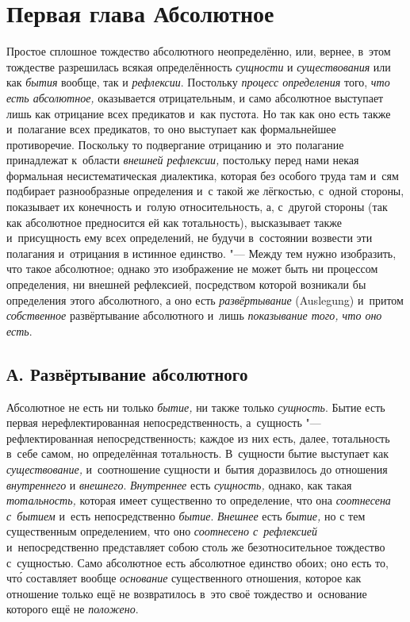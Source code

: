 \chapter[{\em Первая глава} Абсолютное]{Первая глава Абсолютное}

Простое сплошное тождество абсолютного неопределённо, или, вернее, в~этом
тождестве разрешилась всякая определённость {\em сущности} и
{\em существования} или как {\em бытия} вообще, так и {\em рефлексии}.
Постольку {\em процесс определения} того, {\em что есть абсолютное,}
оказывается отрицательным, и
само абсолютное выступает лишь как отрицание всех предикатов и~как пустота.
Но так как оно есть также и~полагание всех предикатов, то оно выступает как
формальнейшее противоречие. Поскольку то подвергание отрицанию и~это
полагание принадлежат к~области {\em внешней
рефлексии,} постольку перед нами некая формальная несистематическая
диалектика, которая без особого труда там и~сям подбирает разнообразные
определения и~с такой же лёгкостью, с~одной стороны, показывает их
конечность и~голую относительность, а, с~другой стороны (так как абсолютное
предносится ей как тотальность), высказывает также и~присущность ему всех
определений, не будучи в~состоянии возвести эти полагания и~отрицания в
истинное единство. "--- Между тем нужно изобразить, что такое абсолютное;
однако это изображение не может быть ни процессом определения, ни внешней
рефлексией, посредством которой возникали бы определения этого абсолютного,
а оно есть {\em развёртывание} (Auslegung) и~притом
{\em собственное} развёртывание абсолютного и~лишь
{\em показывание того, что оно есть}.

\section[А. Развёртывание абсолютного]{А. Развёртывание абсолютного}

Абсолютное не есть ни только
{\em бытие,} ни также только
{\em сущность}. Бытие есть первая нерефлектированная
непосредственность, а~сущность "--- рефлектированная непосредственность;
каждое из них есть, далее, тотальность в~себе самом, но определённая
тотальность. В~сущности бытие выступает как
{\em существование,} и~соотношение сущности и~бытия
доразвилось до отношения {\em внутреннего} и
{\em внешнего}. {\em Внутреннее}
есть {\em сущность,} однако, как такая
{\em тотальность,} которая имеет существенно то
определение, что она {\em соотнесена с~бытием} и~есть
непосредственно {\em бытие}.
{\em Внешнее} есть {\em бытие,} но
с тем существенным определением, что оно
{\em соотнесено с~рефлексией} и~непосредственно
представляет собою столь же безотносительное тождество с~сущностью. Само
абсолютное есть абсолютное единство обоих; оно есть то, чт\'{о} составляет
вообще {\em основание} существенного отношения, которое
как отношение только ещё не возвратилось в~это своё тождество и~основание
которого ещё не {\em положено}.

